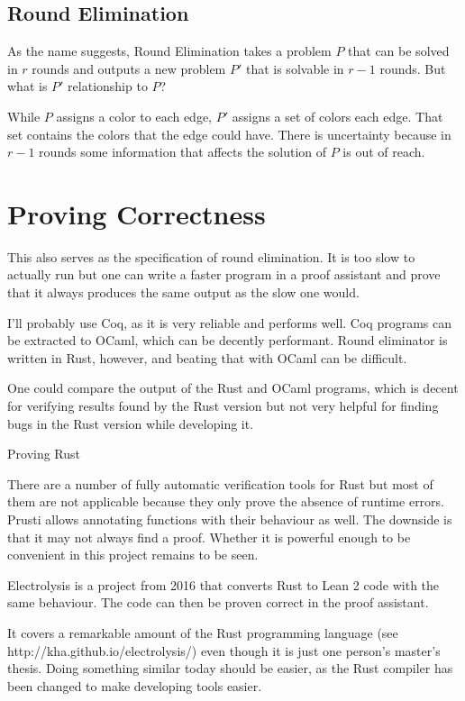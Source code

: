 \documentclass{article}
\begin{document}
\subsection{Round Elimination}

As the name suggests, Round Elimination takes a problem $P$ that can be solved in $r$ rounds and outputs a new problem $P'$ that is solvable in $r-1$ rounds. But what is $P'$ relationship to $P$?

While $P$ assigns a color to each edge, $P'$ assigns a set of colors each edge. That set contains the colors that the edge could have. There is uncertainty because in $r-1$ rounds some information that affects the solution of $P$ is out of reach.

\section{Proving Correctness}
This also serves as the specification of round elimination. It is too slow to actually run but one can write a faster program in a proof assistant and prove that it always produces the same output as the slow one would.

I'll probably use Coq, as it is very reliable and performs well. Coq programs can be extracted to OCaml, which can be decently performant. Round eliminator is written in Rust, however, and beating that with OCaml can be difficult.

One could compare the output of the Rust and OCaml programs, which is decent for verifying results found by the Rust version but not very helpful for finding bugs in the Rust version while developing it.

Proving Rust

There are a number of fully automatic verification tools for Rust but most of them are not applicable because they only prove the absence of runtime errors. Prusti allows annotating functions with their behaviour as well. The downside is that it may not always find a proof. Whether it is powerful enough to be convenient in this project remains to be seen.

Electrolysis is a project from 2016 that converts Rust to Lean 2 code with the same behaviour. The code can then be proven correct in the proof assistant.

It covers a remarkable amount of the Rust programming language (see http://kha.github.io/electrolysis/) even though it is just one person's master's thesis. Doing something similar today should be easier, as the Rust compiler has been changed to make developing tools easier.
\end{document}
